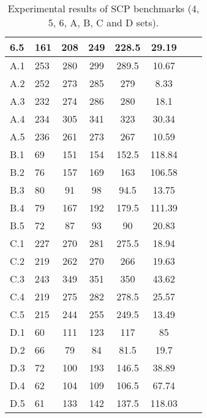 \begin{table}[H]
\begin{center}
{\begin{tabular*}{1\textwidth}{@{\extracolsep{\fill}} l l c c c c c c }
                            6.5 & 161 & 208 & 249 & 228.5 & 29.19& \\
			   \hline
                            A.1  & 253 & 280 & 299 & 289.5 & 10.67& \\
                            A.2  & 252 & 273 & 285 & 279 & 8.33& \\
                            A.3  & 232 & 274 & 286 & 280 & 18.1& \\
                            A.4  & 234 & 305 & 341 & 323 & 30.34& \\
                            A.5  & 236 & 261 & 273 & 267 & 10.59& \\
			   \hline
                            B.1  & 69 & 151 & 154 & 152.5 & 118.84& \\
                            B.2  & 76 & 157 & 169 & 163 & 106.58& \\
                            B.3  & 80 & 91 & 98 & 94.5 & 13.75& \\
                            B.4  & 79 & 167 & 192 & 179.5 & 111.39& \\
                            B.5  & 72 & 87 & 93 & 90 & 20.83& \\
			   \hline
                            C.1  & 227 & 270 & 281 & 275.5 & 18.94& \\
                            C.2  & 219 & 262 & 270 & 266 & 19.63& \\
                            C.3  & 243 & 349 & 351 & 350 & 43.62& \\
                            C.4  & 219 & 275 & 282 & 278.5 & 25.57& \\
                            C.5  & 215 & 244 & 255 & 249.5 & 13.49& \\
			   \hline
                            D.1  & 60 & 111 & 123 & 117 & 85& \\
                            D.2  & 66 & 79 & 84 & 81.5 & 19.7& \\
                            D.3  & 72 & 100 & 193 & 146.5 & 38.89& \\
                            D.4  & 62 & 104 & 109 & 106.5 & 67.74& \\
                            D.5  & 61 & 133 & 142 & 137.5 & 118.03& \\
			\hline
		\end{tabular*}
		}
	\end{center}
	\caption{Experimental results of SCP benchmarks (4, 5, 6, A, B, C and D sets).}\label{table:results1}
\end{table}











